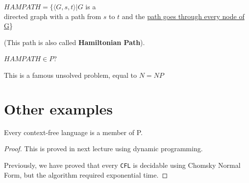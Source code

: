 \begin{example}
    \(HAMPATH = \{\langle G, s, t \rangle  | G\) is a\\ directed graph with a path from \(s\) to \(t\) and the \underline{path goes through every node of G}\}

    (This path is also called \textbf{Hamiltonian Path}).


    \begin{problem}
        \(HAMPATH \in P\)? 

        \begin{remark}
            This is a famous unsolved problem, equal to \(N = NP\) 
        \end{remark}
    \end{problem}

\end{example}

\section{Other examples}

\begin{theorem}
    Every context-free language is a member of P.
\end{theorem}
\begin{proof}
    This is proved in next lecture using dynamic programming.

    Previously, we have proved that every \verb|CFL| is decidable using Chomsky Normal Form, but the algorithm required exponential time.
\end{proof}
